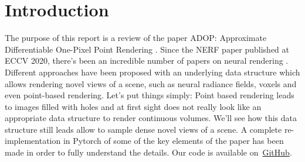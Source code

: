 \section{Introduction}
\label{sec:intro}
The purpose of this report is a review of the paper ADOP: Approximate Differentiable One-Pixel Point Rendering \citet{ruckert2022adop}. 
Since the NERF paper published at ECCV 2020, there's been an incredible number of papers on neural rendering . Different approaches have been proposed with an underlying data structure which allows rendering novel views of a scene, such as neural radiance fields, voxels and even point-based rendering.
Let's put things simply: Point based rendering leads to images filled with holes and at first sight does not really look like an appropriate data structure to render continuous volumes.
We'll see how this data structure still leads allow to sample dense novel views of a scene.
A complete re-implementation in Pytorch of some of the key elements of the paper has been made in order to fully understand the details. 
Our code is available on~\href{https://github.com/balthazarneveu/per-pixel-point-rendering}{GitHub}.
